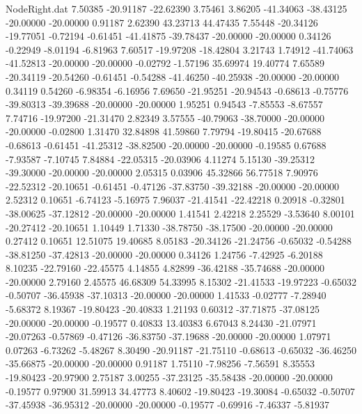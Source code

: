 \begin{filecontents}{NodeRight.dat}
   7.50385  -20.91187  -22.62390     3.75461    3.86205  -41.34063  -38.43125  -20.00000  -20.00000    0.91187    2.62390   43.23713   44.47435
   7.55448  -20.34126  -19.77051    -0.72194   -0.61451  -41.41875  -39.78437  -20.00000  -20.00000    0.34126   -0.22949   -8.01194   -6.81963
   7.60517  -19.97208  -18.42804     3.21743    1.74912  -41.74063  -41.52813  -20.00000  -20.00000   -0.02792   -1.57196   35.69974   19.40774
   7.65589  -20.34119  -20.54260    -0.61451   -0.54288  -41.46250  -40.25938  -20.00000  -20.00000    0.34119    0.54260   -6.98354   -6.16956
   7.69650  -21.95251  -20.94543    -0.68613   -0.75776  -39.80313  -39.39688  -20.00000  -20.00000    1.95251    0.94543   -7.85553   -8.67557
   7.74716  -19.97200  -21.31470     2.82349    3.57555  -40.79063  -38.70000  -20.00000  -20.00000   -0.02800    1.31470   32.84898   41.59860
   7.79794  -19.80415  -20.67688    -0.68613   -0.61451  -41.25312  -38.82500  -20.00000  -20.00000   -0.19585    0.67688   -7.93587   -7.10745
   7.84884  -22.05315  -20.03906     4.11274    5.15130  -39.25312  -39.30000  -20.00000  -20.00000    2.05315    0.03906   45.32866   56.77518
   7.90976  -22.52312  -20.10651    -0.61451   -0.47126  -37.83750  -39.32188  -20.00000  -20.00000    2.52312    0.10651   -6.74123   -5.16975
   7.96037  -21.41541  -22.42218     0.20918   -0.32801  -38.00625  -37.12812  -20.00000  -20.00000    1.41541    2.42218    2.25529   -3.53640
   8.00101  -20.27412  -20.10651     1.10449    1.71330  -38.78750  -38.17500  -20.00000  -20.00000    0.27412    0.10651   12.51075   19.40685
   8.05183  -20.34126  -21.24756    -0.65032   -0.54288  -38.81250  -37.42813  -20.00000  -20.00000    0.34126    1.24756   -7.42925   -6.20188
   8.10235  -22.79160  -22.45575     4.14855    4.82899  -36.42188  -35.74688  -20.00000  -20.00000    2.79160    2.45575   46.68309   54.33995
   8.15302  -21.41533  -19.97223    -0.65032   -0.50707  -36.45938  -37.10313  -20.00000  -20.00000    1.41533   -0.02777   -7.28940   -5.68372
   8.19367  -19.80423  -20.40833     1.21193    0.60312  -37.71875  -37.08125  -20.00000  -20.00000   -0.19577    0.40833   13.40383    6.67043
   8.24430  -21.07971  -20.07263    -0.57869   -0.47126  -36.83750  -37.19688  -20.00000  -20.00000    1.07971    0.07263   -6.73262   -5.48267
   8.30490  -20.91187  -21.75110    -0.68613   -0.65032  -36.46250  -35.66875  -20.00000  -20.00000    0.91187    1.75110   -7.98256   -7.56591
   8.35553  -19.80423  -20.97900     2.75187    3.00255  -37.23125  -35.58438  -20.00000  -20.00000   -0.19577    0.97900   31.59913   34.47773
   8.40602  -19.80423  -19.30084    -0.65032   -0.50707  -37.45938  -36.95312  -20.00000  -20.00000   -0.19577   -0.69916   -7.46337   -5.81937

\end{filecontents}
